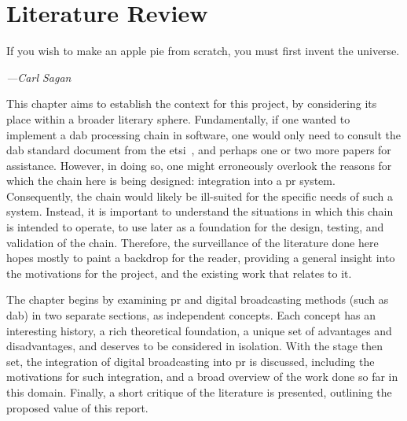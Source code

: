 \documentclass[class=report,11pt,crop=false]{standalone}
\begin{document}
\ifstandalone
\tableofcontents
\fi
\chapter{Literature Review \label{ch:literature}}
\epigraph{If you wish to make an apple pie from scratch, you must first invent the universe.}%
    {\emph{---Carl Sagan}}
This chapter aims to establish the context for this project, by considering its place within a broader literary sphere. Fundamentally, if one wanted to implement a \gls{dab} processing chain in software, one would only need to consult the \gls{dab} standard document from the \gls{etsi}~\cite{dabstandard}, and perhaps one or two more papers for assistance. However, in doing so, one might erroneously overlook the reasons for which the chain here is being designed: integration into a \gls{pr} system. Consequently, the chain would likely be ill-suited for the specific needs of such a system. Instead, it is important to understand the situations in which this chain is intended to operate, to use later as a foundation for the design, testing, and validation of the chain. Therefore, the surveillance of the literature done here hopes mostly to paint a backdrop for the reader, providing a general insight into the motivations for the project, and the existing work that relates to it.

The chapter begins by examining \gls{pr} and digital broadcasting methods (such as \gls{dab}) in two separate sections, as independent concepts. Each concept has an interesting history, a rich theoretical foundation, a unique set of advantages and disadvantages, and deserves to be considered in isolation. With the stage then set, the  integration of digital broadcasting into \gls{pr} is discussed, including the motivations for such integration, and a broad overview of the work done so far in this domain. Finally, a short critique of the literature is presented, outlining the proposed value of this report.

\end{document}
